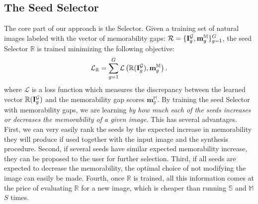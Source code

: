 \documentclass{sig-alternate-05-2015}
\begin{document}
\subsection{The Seed Selector}
\label{sec:seed_select}
The core part of our approach is the Selector.
Given a training set of natural images labeled with the vector of memorability gaps: ${\cal R}=\{\mathbf{I}_g^{\cal G},\mathbf{m}_g^\mathbb{M}\}_{g=1}^{G}$, the seed Selector $\mathbb{R}$ is trained minimizing the following objective:
\begin{equation}{\cal L}_\mathbb{R} = \sum_{g=1}^G  \mathcal{L}\left(\mathbb{R}(\mathbf{I}_g^{\cal G}),\mathbf{m}_g^\mathbb{M}\right).
 \label{loss}
\end{equation}
where $\mathcal{L}$ is a loss function which measures the discrepancy between the learned vector $\mathbb{R}(\mathbf{I}_g^{\cal G})$ and the memorability gap scores $\mathbf{m}_g^\mathbb{M}$.
By training the seed Selector with memorability gaps, we are learning \textit{by how much each of the seeds increases or decreases the memorability of a given image}. This has several advantages. First, we can very easily rank the seeds by the expected increase in memorability they will produce if used together with the input image and the synthesis procedure. Second, if several seeds have similar expected memorability increase, they can be proposed to the user for further selection. Third, if all seeds are expected to decrease the memorability, the optimal choice of not modifying the image can easily be made. Fourth, once $\mathbb{R}$ is trained, all this information comes at the price of evaluating $\mathbb{R}$ for a new image, which is cheaper than running $\mathbb{S}$ and $\mathbb{M}$ $S$ times.
\end{document}
